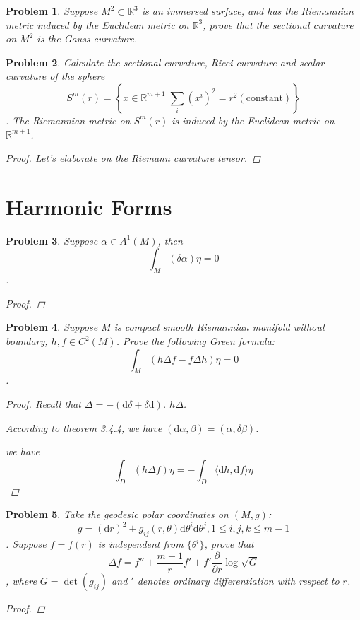 \documentclass[11pt]{article}
\newcommand{\dd}{\mathrm{d}}
\newcommand{\pd}{\partial}
\newcommand{\mr}{\mathbb{R}}
\newtheorem{problem}{Problem}
\numberwithin{problem}{section}
\begin{document}
\begin{problem}
Suppose $M^2\subset \mr^3$ is an immersed surface, and has the Riemannian metric induced by the Euclidean metric on $\mr^3$, prove that the sectional curvature on $M^2$ is the Gauss curvature.
\end{problem}

\begin{problem}
Calculate the sectional curvature, Ricci curvature and scalar curvature of the sphere $$S^m(r) = \left\{x\in \mr ^{m+1} | \sum_i(x^i)^2=r^2 \mathrm{(constant)} \right\}$$. The Riemannian metric on $S^m(r)$ is induced by the Euclidean metric on $\mr^{m+1}$.

\begin{proof}
Let's elaborate on the Riemann curvature tensor.
\end{proof}

\end{problem}

\section{Harmonic Forms}

\begin{problem}
Suppose $\alpha \in A^1(M)$, then $$\int_M(\delta\alpha)\eta = 0$$.
\begin{proof}

\end{proof}

\end{problem}

\begin{problem}
Suppose $M$ is compact smooth Riemannian manifold without boundary, $h,f\in C^2(M)$. Prove the following Green formula:
$$\int_M(h\Delta f-f\Delta h)\eta = 0$$.
\begin{proof}
Recall that $\Delta = -(\dd\delta+\delta\dd)$. $h\Delta$.

According to theorem 3.4.4, we have $(\dd\alpha,\beta)=(\alpha, \delta\beta)$.

we have $$\int_D(h\Delta f)\eta=-\int_D\langle\dd h, \dd f\rangle\eta$$
\end{proof}

\end{problem}

\begin{problem}
Take the geodesic polar coordinates on $(M,g)$:
$$g = (\dd r)^2+g_{ij}(r,\theta)\dd \theta^i\dd \theta^j, 1 \le i,j,k \le m-1$$.
Suppose $f=f(r)$ is independent from $\{\theta^i\}$, prove that
$$\Delta f = f''+\dfrac{m-1}{r}f' + f'\dfrac{\pd}{\pd r}\log \sqrt{G}$$,
where $G=\det(g_{ij})$ and $'$ denotes ordinary differentiation with respect to $r$.
\begin{proof}

\end{proof}

\end{problem}
\end{document}
